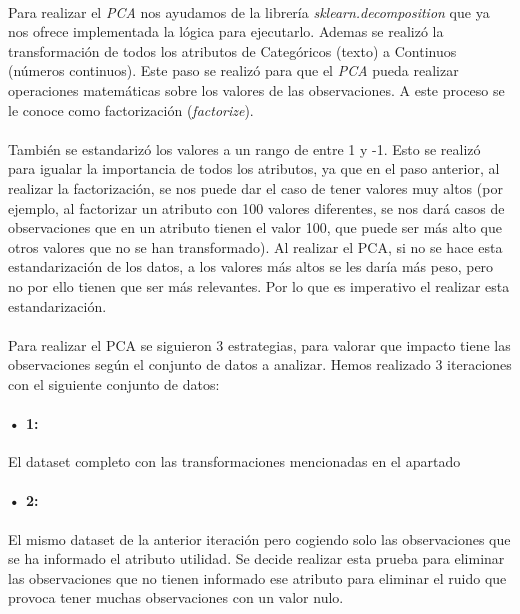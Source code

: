 \label{section:pca_standar}
\paragraph{}
Para realizar el \textit{PCA} nos ayudamos de la librería \textit{sklearn.decomposition} que ya nos ofrece implementada la lógica para ejecutarlo. Ademas se realizó la transformación de todos los atributos de Categóricos (texto) a Continuos (números continuos). Este paso se realizó para que el \textit{PCA} pueda realizar operaciones matemáticas sobre los valores de las observaciones. A este proceso se le conoce como factorización (\textit{factorize}). 

\paragraph{}
También se estandarizó los valores a un rango de entre 1 y -1. Esto se realizó para igualar la importancia de todos los atributos, ya que en el paso anterior, al realizar la factorización, se nos puede dar el caso de tener valores muy altos (por ejemplo, al factorizar un atributo con 100 valores diferentes, se nos dará casos de observaciones que en un atributo tienen el valor 100, que puede ser más alto que otros valores que no se han transformado). Al realizar el PCA, si no se hace esta estandarización de los datos, a los valores más altos se les daría más peso, pero no por ello tienen que ser más relevantes. Por lo que es imperativo el realizar esta estandarización.

\paragraph{}
Para realizar el PCA se siguieron 3 estrategias, para valorar que impacto tiene las observaciones según el conjunto de datos a analizar. Hemos realizado 3 iteraciones con el siguiente conjunto de datos:

\paragraph{• 1: } El dataset completo con las transformaciones mencionadas en el apartado 

\paragraph{• 2: } \label{section:pca_case2}El mismo dataset de la anterior iteración pero cogiendo solo las observaciones que se ha informado el atributo utilidad. Se decide realizar esta prueba para eliminar las observaciones que no tienen informado ese atributo para eliminar el ruido\cite{ref:noisy_data} que provoca tener muchas observaciones con un valor nulo.

